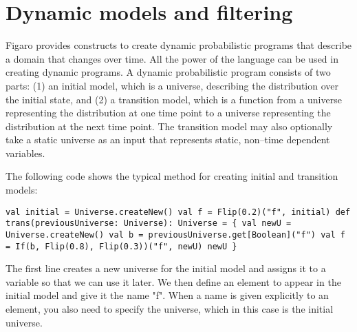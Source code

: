 
\chapter{Dynamic models and filtering} %

\label{Dynamic models and filterings} %

Figaro provides constructs to create dynamic probabilistic programs that describe a domain that changes over time. All the power of the language can be used in creating dynamic programs. A dynamic probabilistic program consists of two parts: (1) an initial model, which is a universe, describing the distribution over the initial state, and (2) a transition model, which is a function from a universe representing the distribution at one time point to a universe representing the distribution at the next time point. The transition model may also optionally take a static universe as an input that represents static, non--time dependent variables.

The following code shows the typical method for creating initial and transition models:

\begin{flushleft}
\texttt{val initial = Universe.createNew()
\newline val f = Flip(0.2)("f", initial)
\newline 
\newline def trans(previousUniverse: Universe): Universe = \{
\newline \tab val newU = Universe.createNew()
\newline \tab val b = previousUniverse.get[Boolean]("f")
\newline \tab val f = If(b, Flip(0.8), Flip(0.3))("f", newU)
\newline \tab newU
\newline \}
}
\end{flushleft}

The first line creates a new universe for the initial model and assigns it to a variable so that we can use it later. We then define an element to appear in the initial model and give it the name "f". When a name is given explicitly to an element, you also need to specify the universe, which in this case is the initial universe.

